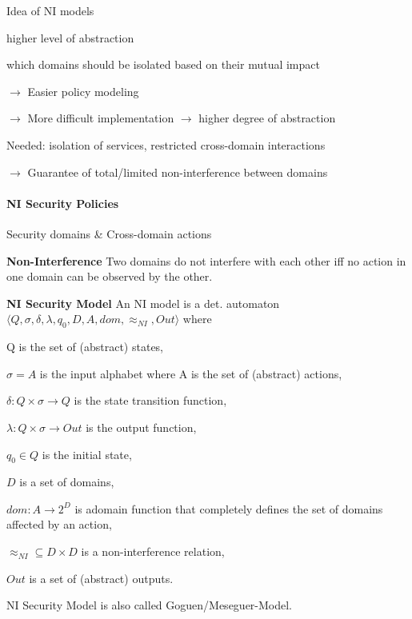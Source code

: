 \documentclass[a4paper]{article}
\renewcommand{\note}[2]{\begin{noteBox} \textbf{#1} #2 \end{noteBox}}
\begin{document}
\begin{multicols}{3}
    Idea of NI models
    \begin{itemize*}
        \item higher level of abstraction
        \item which domains should be isolated based on their mutual impact
        \item[$\rightarrow$] Easier policy modeling
        \item[$\rightarrow$] More difficult implementation $\rightarrow$ higher degree of abstraction
        \item Needed: isolation of services, restricted cross-domain interactions
        \item[$\rightarrow$] Guarantee of total/limited non-interference between domains
    \end{itemize*}

    \paragraph{NI Security Policies}
    Security domains \& Cross-domain actions

    \note{Non-Interference}{Two domains do not interfere with each other iff no action in one domain can be observed by the other.}

    \note{NI Security Model}{An NI model is a det. automaton $\langle Q,\sigma,\delta,\lambda,q_0,D,A,dom,\approx_{NI},Out\rangle$ where
        \begin{itemize*}
            \item Q is the set of (abstract) states,
            \item $\sigma=A$ is the input alphabet where A is the set of (abstract) actions,
            \item $\delta:Q\times\sigma\rightarrow Q$ is the state transition function,
            \item $\lambda:Q\times\sigma\rightarrow Out$ is the output function,
            \item $q_0\in Q$ is the initial state,
            \item $D$ is a set of domains,
            \item $dom:A\rightarrow 2^D$ is adomain function that completely defines the set of domains affected by an action,
            \item $\approx_{NI}\subseteq D\times D$ is a non-interference relation,
            \item $Out$ is a set of (abstract) outputs.
        \end{itemize*}
        NI Security Model is also called Goguen/Meseguer-Model.
    }


\end{multicols}
\end{document}
